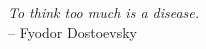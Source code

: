 
{

\vspace*{\fill}

\raggedleft

\textit{To think too much is a disease.} \\
{\small -- Fyodor Dostoevsky}



\vspace*{\fill}

}
